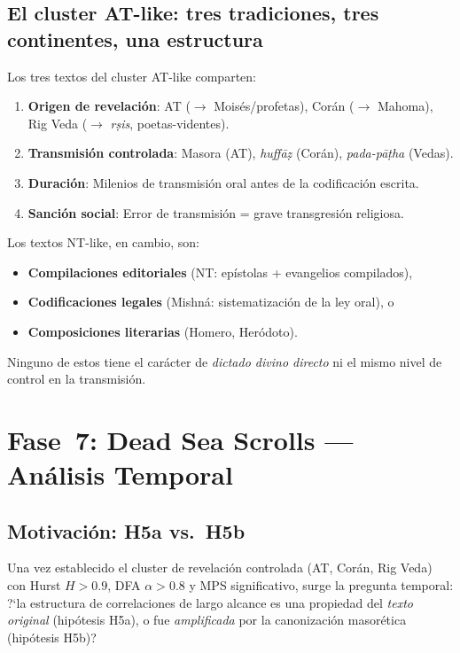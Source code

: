 \documentclass[12pt,a4paper]{article}
\begin{document}
\subsection{El cluster AT-like: tres tradiciones, tres continentes, una estructura}

Los tres textos del cluster AT-like comparten:
\begin{enumerate}[leftmargin=2em]
\item \textbf{Origen de revelaci\'on}: AT ($\to$ Mois\'es/profetas), Cor\'an ($\to$ Mahoma),
      Rig Veda ($\to$ \emph{r\d{s}is}, poetas-videntes).
\item \textbf{Transmisi\'on controlada}: Masora (AT), \emph{huff\=a\d{z}} (Cor\'an),
      \emph{pada-p\=a\d{t}ha} (Vedas).
\item \textbf{Duraci\'on}: Milenios de transmisi\'on oral antes de la codificaci\'on escrita.
\item \textbf{Sanci\'on social}: Error de transmisi\'on = grave transgresi\'on religiosa.
\end{enumerate}

\noindent
Los textos NT-like, en cambio, son:
\begin{itemize}[leftmargin=2em]
\item \textbf{Compilaciones editoriales} (NT: ep\'istolas + evangelios compilados),
\item \textbf{Codificaciones legales} (Mishn\'a: sistematizaci\'on de la ley oral), o
\item \textbf{Composiciones literarias} (Homero, Her\'odoto).
\end{itemize}

\noindent
Ninguno de estos tiene el car\'acter de \emph{dictado divino directo} ni el mismo
nivel de control en la transmisi\'on.


\section{Fase~7: Dead Sea Scrolls --- An\'alisis Temporal}

\subsection{Motivaci\'on: H5a vs.\ H5b}

Una vez establecido el cluster de revelaci\'on controlada (AT, Cor\'an, Rig Veda)
con Hurst $H > 0.9$, DFA $\alpha > 0.8$ y MPS significativo, surge la pregunta
temporal: ?`la estructura de correlaciones de largo alcance es una propiedad del
\emph{texto original} (hip\'otesis H5a), o fue \emph{amplificada} por la canonizaci\'on
masor\'etica (hip\'otesis H5b)?
\end{document}
